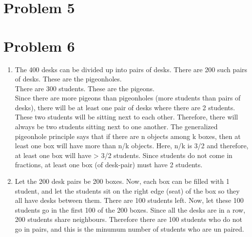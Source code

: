 \documentclass[english]{article}
\begin{document}
\section*{Problem 5}
\section*{Problem 6}
\begin{enumerate} [label=\alph*]
\item The 400 desks can be divided up into pairs of desks. There are 200 such pairs of desks. These are the pigeonholes.
\\ There are 300 students. These are the pigeons.\\ Since there are more pigeons than pigeonholes (more students than pairs of desks), there will be at least one pair of desks where there are 2 students. These two students will be sitting next to each other. Therefore, there will always be two students sitting next to one another.
The generalized pigeonhole principle says that if there are n objects among k boxes, then at least one box will have more than n/k objects. Here, n/k is 3/2 and therefore, at least one box will have > 3/2 students. Since students do not come in fractions, at least one box (of desk-pair) must have 2 students.
\item Let the 200 desk pairs be 200 boxes. Now, each box can be filled with 1 student, and let the students sit on the right edge (seat) of the box so they all have desks between them. There are 100 students left. Now, let these 100 students go in the first 100 of the 200 boxes. Since all the desks are in a row, 200 students share neighbours. Therefore there are 100 students who do not go in pairs, and this is the minumum number of students who are un paired.
\end{enumerate}
\end{document}
